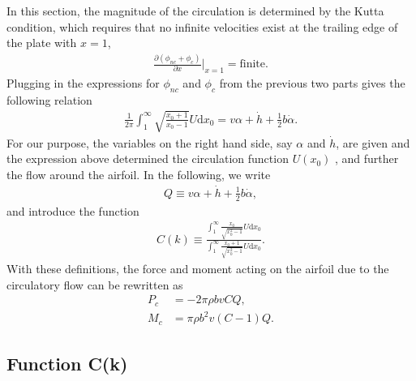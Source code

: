 In this section, the magnitude of the circulation is determined by the Kutta condition, which requires that no infinite velocities exist at the trailing edge of the plate with $x = 1$,
\begin{align}
\frac{\partial (\phi_{nc} + \phi_c)}{\partial x} |_{x = 1} = \text{finite}.
\end{align}
Plugging in the expressions for $\phi_{nc}$ and $\phi_c$ from the previous two parts gives the following relation
\begin{align}       \label{eqn:Kutta}
\frac{1}{2\pi} \int_{1}^{\infty} \sqrt{\frac{x_0+1}{x_0-1}} U \mathrm{d}x_0 = v\alpha + \dot{h} + \frac{1}{2}b\dot{\alpha}.
\end{align}
For our purpose, the variables on the right hand side, say $\alpha$ and $\dot{h}$, are given and the expression above determined the circulation function $U(x_0)$ , and further the flow around the airfoil. 
In the following, we write
\begin{align}
Q \equiv v\alpha + \dot{h} + \frac{1}{2}b\dot{\alpha},
\end{align}
and introduce the function
\begin{align}
C(k) \equiv \frac{\int_{1}^{\infty} \frac{x_0}{\sqrt{x_0^2-1}} U \mathrm{d}x_0}{\int_{1}^{\infty} \frac{x_0+1}{\sqrt{x_0^2-1}} U \mathrm{d}x_0}.
\end{align}
With these definitions, the force and moment acting on the airfoil due to the circulatory flow can be rewritten as
\begin{align}
P_c & = -2\pi \rho b v CQ,  \\
M_c & = \pi \rho b^2 v (C-1)Q.
\end{align}

\subsection{Function C(k)}

